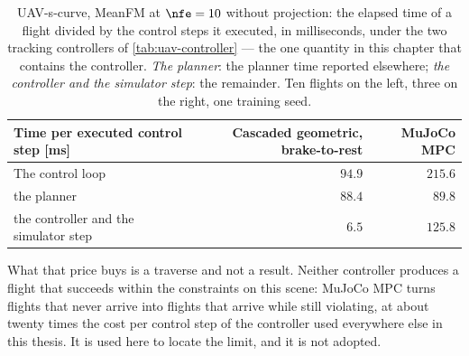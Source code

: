\begin{table}[htpb]
  \caption[UAV-s-curve: what each tracking controller costs per control step]{UAV-s-curve, MeanFM at $\nfe=10$
  without projection: the elapsed time of a flight divided by the control steps it executed, in
  milliseconds, under the two tracking controllers of \autoref{tab:uav-controller} --- the one quantity
  in this chapter that contains the controller. \emph{The planner}: the planner time reported elsewhere;
  \emph{the controller and the simulator step}: the remainder. Ten flights on the left, three on the
  right, one training seed.}
  \label{tab:uav-controller-cost}
  \centering
  \small
  \begin{tabularx}{\linewidth}{@{}L r r@{}}
    \toprule
    Time per executed control step [ms] & Cascaded geometric, brake-to-rest & MuJoCo MPC \\
    \midrule
    The control loop                          & $94.9$ & $215.6$ \\
    \quad the planner                         & $88.4$ & $89.8$ \\
    \quad the controller and the simulator step & $6.5$ & $125.8$ \\
    \bottomrule
  \end{tabularx}
\end{table}

What that price buys is a traverse and not a result. Neither controller produces a flight that succeeds
within the constraints on this scene: MuJoCo MPC turns flights that never arrive into flights
that arrive while still violating, at about twenty times the cost per control step of the controller
used everywhere else in this thesis. It is used here to locate the limit, and it is not adopted.

